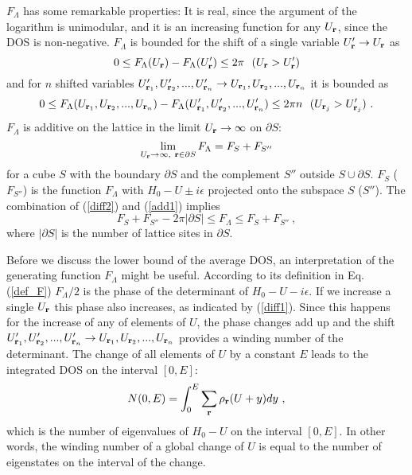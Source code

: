 \documentclass[aps]{revtex4}
\def\beq{\begin{equation}}
\def\eeq{\end{equation}}
\def\br{{\bf r}}
\begin{document}
$F_\Lambda$ has some remarkable properties: It is real, since the argument of the logarithm 
is unimodular, and it is an increasing function for any $U_\br$, since the DOS is non-negative.
$F_\Lambda$ is bounded for the shift of a single variable $U_\br'\to U_\br$ as
\beq
0\le F_\Lambda(U_\br)-F_\Lambda(U_\br')\le 2\pi\ \ (U_\br > U_\br')
\label{diff1}
\eeq
and for $n$ shifted variables 
$U_{\br_1}',U_{\br_2}',...,U_{\br_n}'\to U_{\br_1},U_{\br_2},...,U_{\br_n}$ it is bounded as
\beq
0\le F_\Lambda(U_{\br_1},U_{\br_2},...,U_{\br_n})-F_\Lambda(U_{\br_1}',U_{\br_2}',...,U_{\br_n}')
\le 2\pi n\ \ (U_{\br_j} > U_{\br_j}')
\ .
\label{diff2}
\eeq
$F_\Lambda$ is additive on the lattice in the limit $U_\br\to\infty$ on $\partial S$: 
\beq
\lim_{U_\br\to\infty,\ \br\in \partial S}F_\Lambda= F_S+F_{S''}
\label{add1}
\eeq
for a cube $S$ with the boundary $\partial S$ and the complement $S''$ outside $S\cup\partial S$.
$F_S$ ($F_{S''}$) is the function $F_\Lambda$ with $H_0-U\pm i\epsilon$ projected onto the subspace 
$S$ ($S''$).
The combination of (\ref{diff2}) and (\ref{add1}) implies
\beq
F_S+F_{S''}-2\pi |\partial S|\le F_\Lambda\le F_S+F_{S''} 
\ ,
\label{ineq1}
\eeq
where $|\partial S|$ is the number of lattice sites in $\partial S$.

Before we discuss the lower bound of the average DOS, an interpretation of the generating
function $F_\Lambda$ might be useful. According to its definition in Eq. (\ref{def_F})
$F_\Lambda/2$ is the phase of the determinant of $H_0-U-i\epsilon$. If we increase a single
$U_\br$ this phase also increases, as indicated by (\ref{diff1}). Since this happens for
the increase of any of elements of $U$, the phase changes add up and the shift
$U_{\br_1}',U_{\br_2}',...,U_{\br_n}'\to U_{\br_1},U_{\br_2},...,U_{\br_n}$ provides a winding
number of the determinant. The change of all elements of $U$ by a constant $E$ leads to
the integrated DOS on the interval $[0,E]$:
\beq
N(0,E)=\int_0^E\sum_\br\rho_\br(U+y)dy
\ ,
\eeq
which is the number of eigenvalues of $H_0-U$ on the interval $[0,E]$. In other words, the
winding number of a global change of $U$ is equal to the number of eigenstates on the interval
of the change.  
\end{document}
